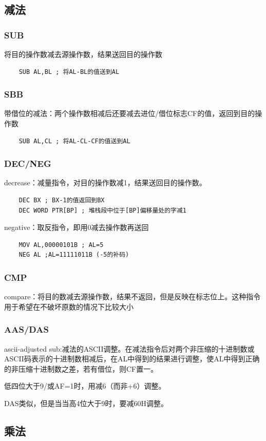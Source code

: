 \subsection{减法}
\subsubsection{SUB}
将目的操作数减去源操作数，结果送回目的操作数
\begin{lstlisting}
    SUB AL,BL ; 将AL-BL的值送到AL
\end{lstlisting}
\subsubsection{SBB}
带借位的减法：两个操作数相减后还要减去进位/借位标志CF的值，返回到目的操作数
\begin{lstlisting}
    SUB AL,CL ; 将AL-CL-CF的值送到AL
\end{lstlisting}
\subsubsection{DEC/NEG}
decrease：减量指令，对目的操作数减1，结果送回目的操作数。
\begin{lstlisting}
    DEC BX ; BX-1的值返回到BX
    DEC WORD PTR[BP] ; 堆栈段中位于[BP]偏移量处的字减1
\end{lstlisting}
negative：取反指令，即用0减去操作数再送回
\begin{lstlisting}
    MOV AL,00000101B ; AL=5
    NEG AL ;AL=11111011B (-5的补码)
\end{lstlisting}
\subsubsection{CMP}
compare：将目的数减去源操作数，结果不返回，但是反映在标志位上。这种指令用于希望在不破坏原数的情况下比较大小
\subsubsection{AAS/DAS}
ascii-adjusted sub:减法的ASCII调整。在减法指令后对两个非压缩的十进制数或ASCII码表示的十进制数相减后，在AL中得到的结果进行调整，使AL中得到正确的非压缩十进制数之差，若有借位，则CF置一。

低四位大于9/或AF=1时，用减6（而非+6）调整。

DAS类似，但是当当高4位大于9时，要减60H调整。
\subsection{乘法}
